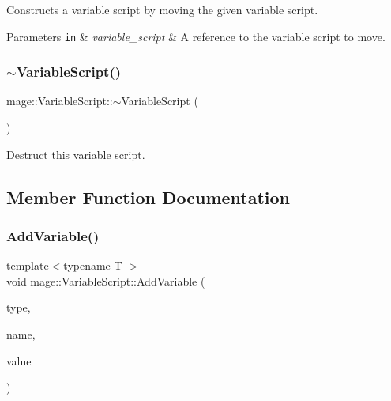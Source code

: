 Constructs a variable script by moving the given variable script.


\begin{DoxyParams}[1]{Parameters}
\mbox{\tt in}  & {\em variable\+\_\+script} & A reference to the variable script to move. \\
\hline
\end{DoxyParams}
\hypertarget{classmage_1_1_variable_script_ae7026e1283b1a1164f02fdc3e1f2b829}{}\label{classmage_1_1_variable_script_ae7026e1283b1a1164f02fdc3e1f2b829} 
\subsubsection{\texorpdfstring{$\sim$\+Variable\+Script()}{~VariableScript()}}
{\footnotesize\ttfamily mage\+::\+Variable\+Script\+::$\sim$\+Variable\+Script (\begin{DoxyParamCaption}{ }\end{DoxyParamCaption})\hspace{0.3cm}{\ttfamily [virtual]}}

Destruct this variable script. 

\subsection{Member Function Documentation}
\hypertarget{classmage_1_1_variable_script_a981ec417c40c5b010fc2199a7aa44f95}{}\label{classmage_1_1_variable_script_a981ec417c40c5b010fc2199a7aa44f95} 
\subsubsection{\texorpdfstring{Add\+Variable()}{AddVariable()}}
{\footnotesize\ttfamily template$<$typename T $>$ \\
void mage\+::\+Variable\+Script\+::\+Add\+Variable (\begin{DoxyParamCaption}\item[{\hyperlink{namespacemage_a530428e73bac0ba7fe84b29086a9e33a}{Variable\+Type}}]{type,  }\item[{const string \&}]{name,  }\item[{const T \&}]{value }\end{DoxyParamCaption})}

